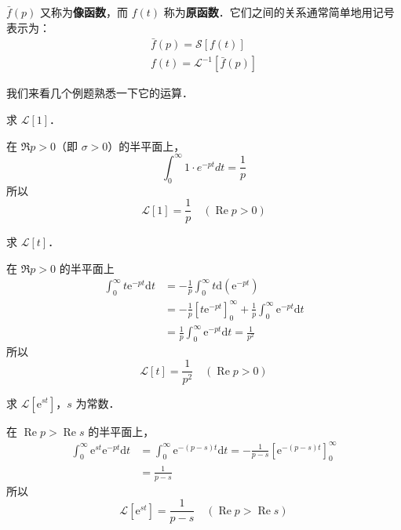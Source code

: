 $\bar f(p)$ 又称为\textbf{像函数}，而 $f(t)$ 称为\textbf{原函数}．它们之间的关系通常简单地用记号表示为：
\begin{equation}
\begin{array}{l}\bar{f}(p)=\mathscr{S}[f(t)] \\ f(t)=\mathscr{L}^{-1}[\bar{f}(p)]\end{array}
\end{equation}

我们来看几个例题熟悉一下它的运算．

\begin{example}{}
求 $\mathscr L[1]$．

在 $\Re p>0$（即 $\sigma>0$）的半平面上，
\begin{equation}
\int_{0}^{\infty} 1 \cdot e^{-p t} d t=\frac{1}{p}
\end{equation}
所以
\begin{equation}
\mathscr{L}[1]=\frac{1}{p} \quad(\operatorname{Re} p>0)
\end{equation}
\end{example}

\begin{example}{}
求 $\mathscr L[t]$．

在 $\Re p>0$ 的半平面上
\begin{equation}
\begin{aligned} \int_{0}^{\infty} t \mathrm{e}^{-p t} \mathrm{d} t &=-\frac{1}{p} \int_{0}^{\infty} t \mathrm{d}\left(\mathrm{e}^{-p t}\right) \\ &=-\frac{1}{p}\left[t \mathrm{e}^{-p t}\right]_{0}^{\infty}+\frac{1}{p} \int_{0}^{\infty} \mathrm{e}^{-p t} \mathrm{d} t \\ &=\frac{1}{p} \int_{0}^{\infty} \mathrm{e}^{-p t} \mathrm{d} t=\frac{1}{p^{2}} \end{aligned}
\end{equation}
所以
\begin{equation}
\mathscr{L}[t]=\frac{1}{p^{2}} \quad(\operatorname{Re} p>0)
\end{equation}
\end{example}

\begin{example}{}
求 $\mathscr L[\mathrm e^{st}]$，$s$ 为常数．

在 $\operatorname{Re} p>\operatorname{Re} s$ 的半平面上，
\begin{equation}
\begin{aligned} \int_{0}^{\infty} \mathrm{e}^{s t} \mathrm{e}^{-p t} \mathrm{d} t &=\int_{0}^{\infty} \mathrm{e}^{-(p-s) t} \mathrm{d} t=-\frac{1}{p-s}\left[\mathrm{e}^{-(p-s) t}\right]_{0}^{\infty} \\ &=\frac{1}{p-s} \end{aligned}
\end{equation}
所以
\begin{equation}
\mathscr{L}\left[\mathrm{e}^{st}\right]=\frac{1}{p-s} \quad(\operatorname{Re} p>\operatorname{Re} s)
\end{equation}
\end{example}

